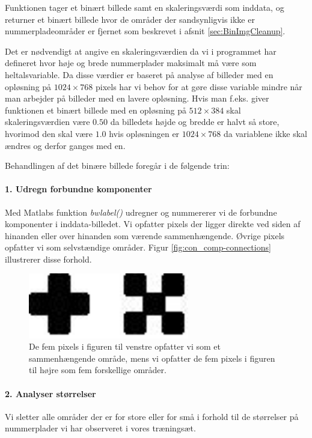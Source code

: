 Funktionen tager et binært billede samt en skaleringsværdi som inddata, og returner et binært billede hvor de områder der sandsynligvis ikke er nummerpladeområder er fjernet som beskrevet i afsnit \vref{sec:BinImgCleanup}.

Det er nødvendigt at angive en skaleringsværdien da vi i programmet har defineret hvor høje og brede nummerplader maksimalt må være som heltalsvariable. Da disse værdier er baseret på analyse af billeder med en opløsning på $1024 \times 768$ pixels har vi behov for at gøre disse variable mindre når man arbejder på billeder med en lavere opløsning. Hvis man f.eks. giver funktionen et binært billede med en opløsning på $512 \times 384$ skal skaleringsværdien være $0.50$ da billedets højde og bredde er halvt så store, hvorimod den skal være $1.0$ hvis opløsningen er $1024 \times 768$ da variablene ikke skal ændres og derfor ganges med en.

Behandlingen af det binære billede foregår i de følgende trin:

\paragraph{1. Udregn forbundne komponenter}
Med Matlabs funktion \textit{bwlabel()} udregner og nummererer vi de forbundne komponenter i inddata-billedet. Vi opfatter pixels der ligger direkte ved siden af hinanden eller over hinanden som værende sammenhængende. Øvrige pixels opfatter vi som selvstændige områder. Figur \vref{fig:con_comp-connections} illustrerer disse forhold.

\begin{figure}[htp]
\centering
\includegraphics[width=7cm]{implementation/illu/con_comp-connections.jpg}
\caption{De fem pixels i figuren til venstre opfatter vi som et sammenhængende område, mens vi opfatter de fem pixels i figuren til højre som fem forskellige områder.}
\label{fig:con_comp-connections}
\end{figure}

\paragraph{2. Analyser størrelser}
Vi sletter alle områder der er for store eller for små i forhold til de størrelser på nummerplader vi har observeret i vores træningsæt.


